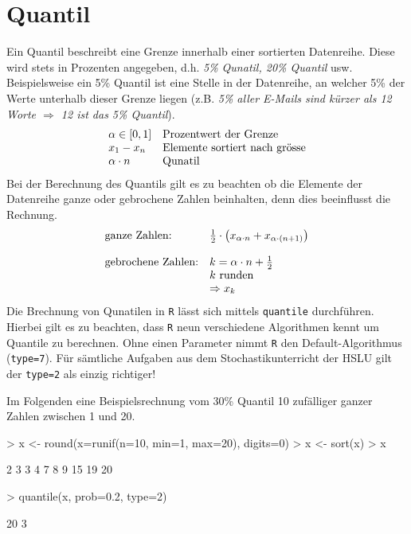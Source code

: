 \section{Quantil}
Ein Quantil beschreibt eine Grenze innerhalb einer sortierten 
Datenreihe. Diese wird stets in Prozenten angegeben, d.h. 
\emph{5\% Qunatil, 20\% Quantil} usw. 
Beispielsweise ein 5\% Quantil ist eine Stelle in der Datenreihe, an 
welcher 5\% der Werte unterhalb dieser Grenze liegen (z.B. \emph{5\% 
aller E-Mails sind kürzer als 12 Worte $\Rightarrow$ 12 ist das 5\%
Quantil}).
\[ \begin{array}{l l}
	\alpha \in [0, 1] 
		& \text{Prozentwert der Grenze} \\
	x_1 - x_n
		& \text{Elemente sortiert nach grösse} \\
	\alpha \cdot n 
		& \text{Qunatil} \\
\end{array} \]
Bei der Berechnung des Quantils gilt es zu beachten ob die Elemente 
der Datenreihe ganze oder gebrochene Zahlen beinhalten, denn dies 
beeinflusst die Rechnung.
\[ \begin{array}{l l}
	\text{ganze Zahlen:}
		& \frac{1}{2} \cdot \left(
			x_{\alpha \cdot n} 
			+ x_{\alpha \cdot (n + 1)} \right)  \\
	& \\
	\text{gebrochene Zahlen:}
		& k = \alpha \cdot n + \frac{1}{2}  \\
		& k \text{ runden} \\
		& \Rightarrow x_{k}
\end{array} \]
Die Brechnung von Qunatilen in \lstinline{R} lässt sich mittels 
\lstinline{quantile} durchführen. Hierbei gilt es zu beachten, dass
\lstinline{R} neun verschiedene Algorithmen kennt um Quantile zu 
berechnen. Ohne einen Parameter nimmt \lstinline{R} den 
Default-Algorithmus (\lstinline{type=7}). Für sämtliche Aufgaben aus dem
Stochastikunterricht der HSLU gilt der \lstinline{type=2} als einzig
richtiger! 

Im Folgenden eine Beispielsrechnung vom 30\% Quantil 10 zufälliger 
ganzer Zahlen zwischen 1 und 20.
\begin{Schunk}
\begin{Sinput}
> x <- round(x=runif(n=10, min=1, max=20), digits=0)
> x <- sort(x)
> x
\end{Sinput}
\begin{Soutput}
 [1]  2  3  3  4  7  8  9 15 19 20
\end{Soutput}
\begin{Sinput}
> quantile(x, prob=0.2, type=2)
\end{Sinput}
\begin{Soutput}
20% 
  3 
\end{Soutput}
\end{Schunk}

